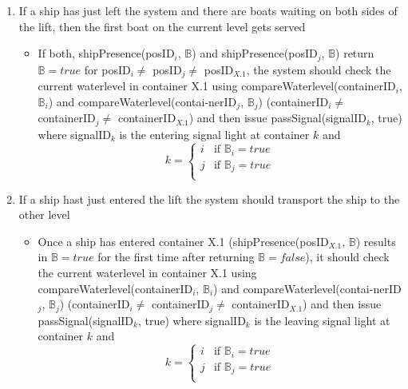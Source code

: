 \begin{enumerate}
	\item If a ship has just left the system and there are boats waiting on both sides of the lift, then the first boat on the current level gets served
		\begin{itemize}
			\item If both, shipPresence(posID$_i$, $\mathbb{B}$) and shipPresence(posID$_j$, $\mathbb{B}$) return $\mathbb{B} = true$ for posID$_i \neq$ posID$_j \neq$ posID$_{X.1}$, the system should check the current waterlevel in container X.1 using \linebreak compareWaterlevel(containerID$_i$, $\mathbb{B}_i$) and compareWaterlevel(contai-nerID$_j$, $\mathbb{B}_j$) (containerID$_i \neq$ containerID$_j \neq$ containerID$_{X.1}$) and then issue passSignal(signalID$_k$, true) where signalID$_k$ is the entering signal light at container $k$ and
			\begin{equation*}
				k = 
				\begin{cases}
					i & \text{if } \mathbb{B}_i = true\\
					j & \text{if } \mathbb{B}_j = true\\
				\end{cases}
			\end{equation*}
		\end{itemize}
		
	\item If a ship hast just entered the lift the system should transport the ship to the other level
		\begin{itemize}
			\item Once a ship has entered container X.1 (shipPresence(posID$_{X.1}$, $\mathbb{B}$) results in $\mathbb{B} = true$ for the first time after returning $\mathbb{B} = false$), it should check the current waterlevel in container X.1 using \linebreak compareWaterlevel(containerID$_i$, $\mathbb{B}_i$) and compareWaterlevel(contai-nerID$_j$, $\mathbb{B}_j$) (containerID$_i \neq$ containerID$_j \neq$ containerID$_{X.1}$) and then issue passSignal(signalID$_k$, true) where signalID$_k$ is the leaving signal light at container $k$ and
			\begin{equation*}
				k = 
				\begin{cases}
					i & \text{if } \mathbb{B}_i = true\\
					j & \text{if } \mathbb{B}_j = true\\
				\end{cases}
			\end{equation*}
		\end{itemize}
	\end{enumerate}